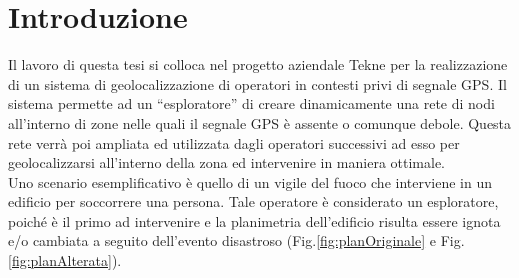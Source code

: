 \chapter*{Introduzione}
\thispagestyle{empty}

Il lavoro di questa tesi si colloca nel progetto aziendale Tekne per la realizzazione di un sistema di geolocalizzazione di operatori in contesti privi di segnale GPS.
Il sistema permette ad un “esploratore” di creare dinamicamente una rete di nodi all’interno di zone nelle quali il segnale GPS è assente o comunque debole. Questa rete verrà poi ampliata ed utilizzata dagli operatori successivi ad esso per geolocalizzarsi all’interno della zona ed intervenire in maniera ottimale. \\
Uno scenario esemplificativo è quello di un vigile del fuoco che interviene in un edificio per soccorrere una persona. Tale operatore è considerato un esploratore, poiché è il primo ad intervenire e la planimetria dell’edificio risulta essere ignota e/o cambiata a seguito dell’evento disastroso (Fig.\ref{fig:planOriginale} e Fig.\ref{fig:planAlterata}). 

